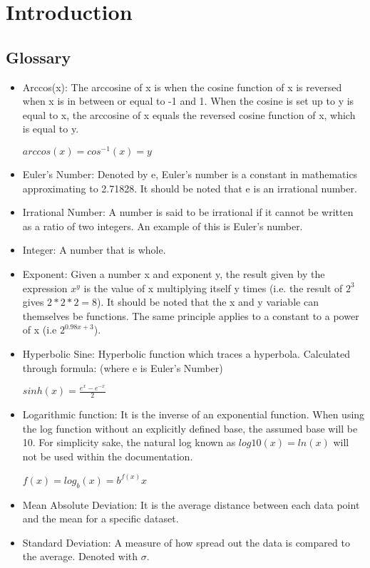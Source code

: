 \section{Introduction}
    \subsection{Glossary}
        \begin{itemize}
            \item Arccos(x): The arccosine of x is when the cosine function of x is reversed when x is in between or equal to -1 and 1. When the cosine is set up to y is equal to x, the arccosine of x equals the reversed cosine function of x, which is equal to y. \cite{arccos}
            \begin{center}
                $arccos(x) = cos^{-1}(x) = y$
            \end{center}
            \item Euler’s Number: Denoted by e, Euler’s number is a constant in mathematics approximating to 2.71828. It should be noted that e is an irrational number.\cite{boundless}
            \item Irrational Number: A number is said to be irrational if it cannot be written as a ratio of two integers. An example of this is Euler’s number. \cite{wolfram}
            \item Integer: A number that is whole. \cite{merriam}
            \item Exponent: Given a number x and exponent y, the result given by the expression $x^y$ is the value of x multiplying itself y times (i.e. the result of $2^3$ gives $2 * 2 * 2 = 8$). It should be noted that the x and y variable can themselves be functions. The same principle applies to a constant to a power of x (i.e $2^{0.98x+3}$).
            \item Hyperbolic Sine: Hyperbolic function which traces a hyperbola. Calculated through formula: (where e is Euler’s Number) \cite{encyclopaedia}
            \begin{center}
                $sinh(x) =  \frac{e^x - e^{-x}} {2}$
            \end{center}
            \item Logarithmic function: It is the inverse of an exponential function. When using the log function without an explicitly defined base, the assumed base will be 10. For simplicity sake, the natural log known as $log10(x) = ln(x)$ will not be used within the documentation.\cite{dawkins}
            \begin{center}
                $f(x) = log_b(x) = b^{f(x)}x$
            \end{center}
            \item  Mean Absolute Deviation: It is the average distance between each data point and the mean for a specific dataset. \cite{khan}
            \item Standard Deviation: A measure of how spread out the data is compared to the average. Denoted with $\sigma$. \cite{students}
        \end{itemize}
    
